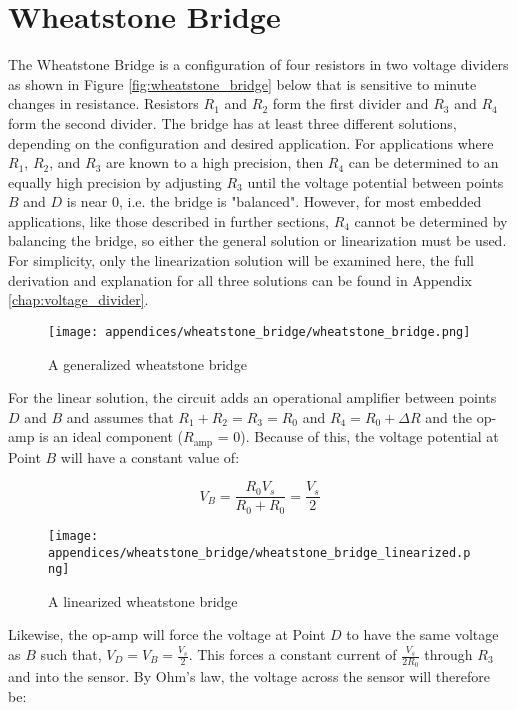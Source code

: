 \chapter{Wheatstone Bridge} 
The Wheatstone Bridge is a configuration of four resistors in two voltage dividers as shown in Figure \ref{fig:wheatstone_bridge} below that is sensitive to minute changes in resistance.
Resistors $R_1$ and $R_2$ form the first divider and $R_3$ and $R_4$ form the second divider.
The bridge has at least three different solutions, depending on the configuration and desired application.
For applications where $R_1$, $R_2$, and $R_3$ are known to a high precision, then $R_4$ can be determined to an equally high precision by adjusting $R_3$ until the voltage potential between points $B$ and $D$ is near 0, i.e. the bridge is "balanced".
However, for most embedded applications, like those described in further sections, $R_4$ cannot be determined by balancing the bridge, so either the general solution or linearization must be used.
For simplicity, only the linearization solution will be examined here, the full derivation and explanation for all three solutions can be found in Appendix \ref{chap:voltage_divider}.

\begin{figure}[h!]
    \caption{A generalized wheatstone bridge}
    \centering
    \texttt{[image: appendices/wheatstone\_bridge/wheatstone\_bridge.png]}
\end{figure}

For the linear solution, the circuit adds an operational amplifier between points $D$ and $B$ and assumes that $R_1+R_2=R_3=R_0$ and $R_4 = R_0 + \Delta R$ and the op-amp is an ideal component ($R_{\text{amp}}$ = 0).
Because of this, the voltage potential at Point $B$ will have a constant value of:

\begin{equation*}
    V_B = \frac{R_0 V_s}{R_0 + R_0} = \frac{V_s}{2}
\end{equation*}

\begin{figure}[h!]
    \caption{A linearized wheatstone bridge}
    \centering
    \texttt{[image: appendices/wheatstone\_bridge/wheatstone\_bridge\_linearized.png]}
\end{figure}

Likewise, the op-amp will force the voltage at Point $D$ to have the same voltage as $B$ such that, $V_D = V_B = \frac{V_s}{2} $.
This forces a constant current of $\frac{V_s}{2R_0} $ through $R_3$ and into the sensor.
By Ohm's law, the voltage across the sensor will therefore be:

